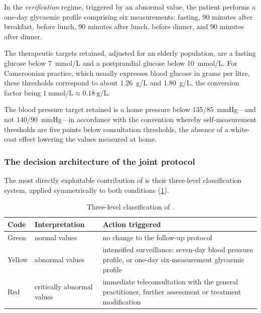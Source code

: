 \documentclass[12pt,a4paper,oneside]{report}
\begin{document}
In the \emph{verification} regime, triggered by an abnormal value, the patient performs a one-day glycaemic profile comprising six measurements: fasting, 90 minutes after breakfast, before lunch, 90 minutes after lunch, before dinner, and 90 minutes after dinner.

The therapeutic targets retained, adjusted for an elderly population, are a fasting glucose below 7~mmol/L and a postprandial glucose below 10~mmol/L. For Cameroonian practice, which usually expresses blood glucose in grams per litre, these thresholds correspond to about 1.26~g/L and 1.80~g/L, the conversion factor being $1\ \text{mmol/L} \approx 0.18\ \text{g/L}$.

The blood pressure target retained is a home pressure below 135/85~mmHg---and not 140/90~mmHg---in accordance with the convention whereby self-measurement thresholds are five points below consultation thresholds, the absence of a white-coat effect lowering the values measured at home.

\subsubsection{The decision architecture of the joint protocol}\label{sec:triage}

The most directly exploitable contribution of \textcite{mihevc2025} is their three-level classification system, applied symmetrically to both conditions (\cref{tab:triage-levels}).

\begin{table}[htbp]
\centering\small
\caption{Three-level classification of \textcite{mihevc2025}.}\label{tab:triage-levels}
\begin{tabularx}{\textwidth}{@{}>{\raggedright\arraybackslash}p{1.7cm} >{\raggedright\arraybackslash}p{3.6cm} X@{}}
\toprule
\textbf{Code} & \textbf{Interpretation} & \textbf{Action triggered} \\
\midrule
Green & normal values & no change to the follow-up protocol \\
Yellow & abnormal values & intensified surveillance: seven-day blood pressure profile, or one-day six-measurement glycaemic profile \\
Red & critically abnormal values & immediate teleconsultation with the general practitioner, further assessment or treatment modification \\
\bottomrule
\end{tabularx}
\end{table}
\end{document}
